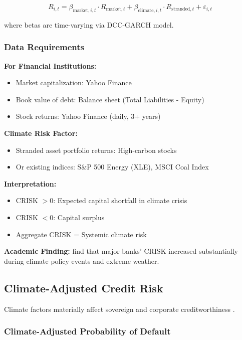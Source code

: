 \documentclass[11pt,a4paper]{article}
\begin{document}
\begin{equation}
R_{i,t} = \beta_{\text{market},i,t} \cdot R_{\text{market},t} + \beta_{\text{climate},i,t} \cdot R_{\text{stranded},t} + \varepsilon_{i,t}
\end{equation}

where betas are time-varying via DCC-GARCH model.

\subsubsection{Data Requirements}

\textbf{For Financial Institutions:}
\begin{itemize}
    \item Market capitalization: Yahoo Finance
    \item Book value of debt: Balance sheet (Total Liabilities - Equity)
    \item Stock returns: Yahoo Finance (daily, 3+ years)
\end{itemize}

\textbf{Climate Risk Factor:}
\begin{itemize}
    \item Stranded asset portfolio returns: High-carbon stocks
    \item Or existing indices: S\&P 500 Energy (XLE), MSCI Coal Index
\end{itemize}

\textbf{Interpretation:}
\begin{itemize}
    \item CRISK $> 0$: Expected capital shortfall in climate crisis
    \item CRISK $< 0$: Capital surplus
    \item Aggregate CRISK = Systemic climate risk
\end{itemize}

\textbf{Academic Finding:} \citet{Jung2021} find that major banks' CRISK increased substantially during climate policy events and extreme weather.

\subsection{Climate-Adjusted Credit Risk}

Climate factors materially affect sovereign and corporate creditworthiness \citep{Klusak2023, Capasso2025}.

\subsubsection{Climate-Adjusted Probability of Default}
\end{document}
